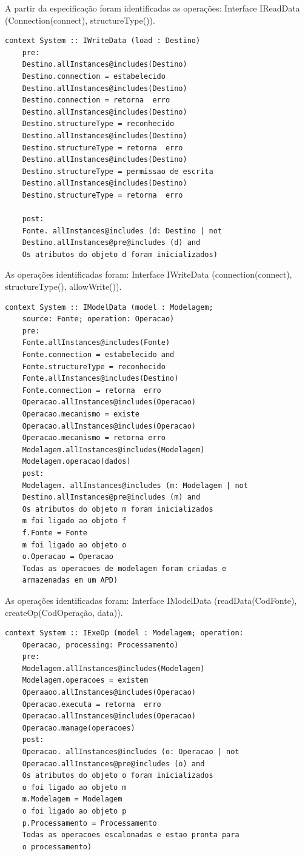 A partir da especificação foram identificadas as operações: Interface IReadData (Connection(connect), structureType()).

\begin{lstlisting}[frame=single, language=Oberon-2, basicstyle=\tiny]
	context System :: IWriteData (load : Destino)
	pre:
	Destino.allInstances@includes(Destino) 
	Destino.connection = estabelecido
	Destino.allInstances@includes(Destino) 
	Destino.connection = retorna  erro
	Destino.allInstances@includes(Destino)
	Destino.structureType = reconhecido
	Destino.allInstances@includes(Destino)
	Destino.structureType = retorna  erro
	Destino.allInstances@includes(Destino) 
	Destino.structureType = permissao de escrita
	Destino.allInstances@includes(Destino)
	Destino.structureType = retorna  erro

	post:
	Fonte. allInstances@includes (d: Destino | not 
	Destino.allInstances@pre@includes (d) and
	Os atributos do objeto d foram inicializados)
\end{lstlisting}

As operações identificadas foram: Interface IWriteData (connection(connect), structureType(), allowWrite()).

\begin{lstlisting}[frame=single, language=Oberon-2, basicstyle=\tiny]
	context System :: IModelData (model : Modelagem; 
	source: Fonte; operation: Operacao)
	pre:
	Fonte.allInstances@includes(Fonte) 
	Fonte.connection = estabelecido and  
	Fonte.structureType = reconhecido	
	Fonte.allInstances@includes(Destino) 
	Fonte.connection = retorna  erro	
	Operacao.allInstances@includes(Operacao) 
	Operacao.mecanismo = existe	
	Operacao.allInstances@includes(Operacao) 
	Operacao.mecanismo = retorna erro	
	Modelagem.allInstances@includes(Modelagem) 
	Modelagem.operacao(dados)	
	post:	
	Modelagem. allInstances@includes (m: Modelagem | not 
	Destino.allInstances@pre@includes (m) and
	Os atributos do objeto m foram inicializados
	m foi ligado ao objeto f
	f.Fonte = Fonte
	m foi ligado ao objeto o
	o.Operacao = Operacao
	Todas as operacoes de modelagem foram criadas e 
	armazenadas em um APD)
\end{lstlisting}

As operações identificadas foram: Interface IModelData (readData(CodFonte), createOp(CodOperação, data)).

\begin{lstlisting}[frame=single, language=Oberon-2, basicstyle=\tiny]
	context System :: IExeOp (model : Modelagem; operation: 
	Operacao, processing: Processamento)
	pre:
	Modelagem.allInstances@includes(Modelagem) 
	Modelagem.operacoes = existem 
	Operaaoo.allInstances@includes(Operacao) 
	Operacao.executa = retorna  erro	
	Operacao.allInstances@includes(Operacao) 
	Operacao.manage(operacoes)	
	post:
	Operacao. allInstances@includes (o: Operacao | not 
	Operacao.allInstances@pre@includes (o) and	
	Os atributos do objeto o foram inicializados
	o foi ligado ao objeto m
	m.Modelagem = Modelagem
	o foi ligado ao objeto p
	p.Processamento = Processamento
	Todas as operacoes escalonadas e estao pronta para 
	o processamento)

\end{lstlisting}

